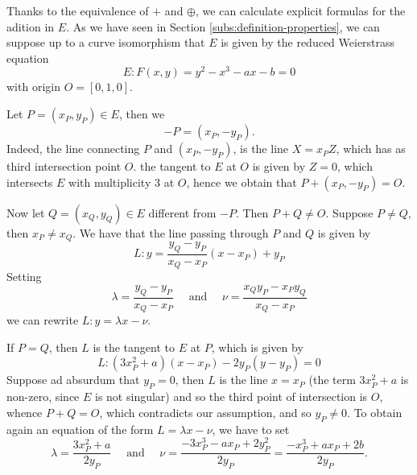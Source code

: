 
Thanks to the equivalence of $+$ and $\oplus$, we can calculate explicit
formulas for the adition in $E$. As we have seen in
Section \ref{subs:definition-properties}, we can suppose up to a curve isomorphism
that $E$ is given by the reduced Weierstrass equation
\begin{equation*}
	E: F(x, y) = y^2 - x^3 - ax - b = 0
\end{equation*}
with origin $O = [0, 1, 0]$.

Let $P = (x_P, y_P) \in E$, then we
\begin{equation*}
	-P = (x_P, -y_P).
\end{equation*}
Indeed, the line connecting $P$ and $(x_P, -y_P)$, is the line
$X = x_PZ$, which has as third intersection point $O$.
the tangent to $E$ at $O$ is given by $Z = 0$,
which intersects $E$ with multiplicity 3 at $O$,
hence we obtain that $P+(x_P, -y_P) = O$.

Now let $Q = (x_Q, y_Q) \in E$ different from $-P$. Then $P + Q \neq O$.
Suppose $P \neq Q$, then $x_P \neq x_Q$. 
We have that the line passing through $P$ and $Q$ is given by
\begin{equation*}
	L: y = \frac{y_Q - y_P}{x_Q - x_P}(x - x_P) + y_P
\end{equation*}
Setting 
\begin{equation*}
	\lambda = \frac{y_Q - y_P}{x_Q - x_P}
	\quad\textrm{ and }\quad
	\nu = \frac{x_Qy_P - x_Py_Q}{x_Q - x_P}
\end{equation*}
we can rewrite $L: y = \lambda x - \nu$.

If $P = Q$, then $L$ is the tangent to $E$ at $P$, which is given by
\begin{equation*}
	L: (3x_P^2 + a)(x - x_P) - 2y_P(y - y_P) = 0
\end{equation*}
Suppose ad absurdum that $y_P = 0$,
then $L$ is the line $x = x_P$ (the term $3x_P^2 + a$ is non-zero, since
$E$ is not singular) and so the third point of intersection
is $O$, whence $P + Q = O$, which contradicts our assumption, and so 
$y_P \neq 0$.
To obtain again an equation of the form $L = \lambda x - \nu$, we have to set
\begin{equation*}
	\lambda = \frac{3x_P^2 + a}{2y_P}
	\quad\textrm{ and }\quad
	\nu = \frac{-3x_P^3 - ax_P + 2y_P^2}{2y_P}
	= \frac{-x_P^3 + ax_P + 2b}{2y_P}.
\end{equation*}


